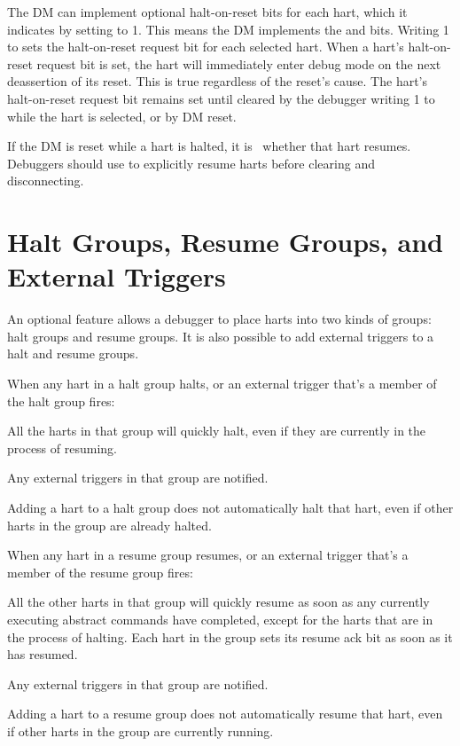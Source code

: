 The DM can implement optional halt-on-reset bits for each hart,
which it indicates by setting \FdmDmstatusHasresethaltreq to 1.
This means the DM implements the \FdmDmcontrolSetresethaltreq and \FdmDmcontrolClrresethaltreq bits.
Writing 1 to \FdmDmcontrolSetresethaltreq sets the halt-on-reset request bit for each
selected hart.
When a hart's halt-on-reset request bit is set, the hart will immediately enter
debug mode on the next deassertion of its reset. This is true regardless of
the reset's cause.
The hart's halt-on-reset request bit remains set
until cleared by the debugger writing 1 to \FdmDmcontrolClrresethaltreq
while the hart is selected, or by DM reset.

If the DM is reset while a hart is halted, it is \unspecified\ whether
that hart resumes.  Debuggers should use \FdmDmcontrolResumereq to
explicitly resume harts before clearing \FdmDmcontrolDmactive and
disconnecting.

\section{Halt Groups, Resume Groups, and External Triggers} \label{hrgroups}

An optional feature allows a debugger to place harts into two kinds of groups: halt
groups and resume groups.  It is also possible to add external triggers to a
halt and resume groups.

\begin{steps}{When any hart in a halt group halts, or an external trigger
    that's a member of the halt group fires:}
\item All the harts in that group will quickly halt, even if they are currently
    in the process of resuming.
\item Any external triggers in that group are notified.
\end{steps}
Adding a hart to a halt group does not automatically halt that hart, even if
other harts in the group are already halted.

\begin{steps}{When any hart in a resume group resumes, or an external trigger
    that's a member of the resume group fires:}
\item All the other harts in that group will quickly resume as soon as any
    currently executing abstract commands have completed, except for the harts
    that are in the process of halting.
    Each hart in the group sets its resume ack bit as soon as it has resumed.
\item Any external triggers in that group are notified.
\end{steps}
Adding a hart to a resume group does not automatically resume that hart, even
if other harts in the group are currently running.

